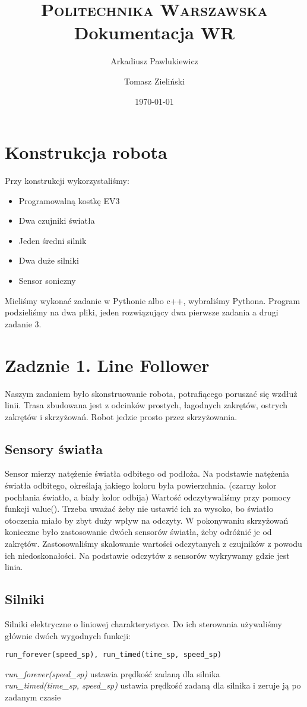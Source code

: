 \documentclass[paper=a4, fontsize=11pt]{scrartcl} %
\title{	
\normalfont \normalsize 
\textsc{Politechnika Warszawska} \\ [25pt] %
\huge Dokumentacja WR \\ %
}
\author{Arkadiusz Pawlukiewicz \and Tomasz Zieliński}
\date{\normalsize\today}
\numberwithin{equation}{section} %
\numberwithin{figure}{section} %
\numberwithin{table}{section} %
\begin{document}
\maketitle 

\section{Konstrukcja robota}
Przy konstrukcji wykorzystaliśmy:
\begin{itemize}  
\item Programowalną kostkę EV3 
\item Dwa czujniki światła  
\item Jeden średni silnik  
\item Dwa duże silniki  
\item Sensor soniczny 
\end{itemize}
Mieliśmy wykonać zadanie w Pythonie albo c++, wybraliśmy Pythona.  
Program podzieliśmy na dwa pliki, jeden rozwiązujący dwa pierwsze zadania a drugi zadanie 3. 
\section{Zadznie 1. Line Follower}
Naszym zadaniem było skonstruowanie robota, potrafiącego poruszać się wzdłuż linii. Trasa zbudowana jest z odcinków prostych, łagodnych zakrętów, ostrych zakrętów i skrzyżowań. Robot  jedzie prosto przez skrzyżowania. 
\subsection{Sensory światła }
Sensor mierzy natężenie światła odbitego od podłoża.  Na podstawie natężenia światła odbitego, określają jakiego koloru była powierzchnia. (czarny kolor pochłania światło, a biały kolor odbija) Wartość odczytywaliśmy przy pomocy funkcji value(). Trzeba uważać żeby nie ustawić ich za wysoko, bo światło otoczenia miało by zbyt duży wpływ na odczyty. W pokonywaniu  skrzyżowań konieczne było zastosowanie dwóch sensorów światła, żeby odróżnić je od zakrętów.  Zastosowaliśmy skalowanie wartości odczytanych z czujników z powodu ich  niedoskonałości.  Na podstawie odczytów z sensorów wykrywamy gdzie jest linia. 
\subsection{Silniki}
Silniki elektryczne o liniowej charakterystyce. Do ich sterowania używaliśmy głównie dwóch wygodnych funkcji:
\begin{lstlisting}
run_forever(speed_sp), run_timed(time_sp, speed_sp)
\end{lstlisting}
\textit{run\_forever(speed\_sp)} ustawia prędkość zadaną dla silnika \\
\textit{run\_timed(time\_sp, speed\_sp)}  ustawia prędkość zadaną dla silnika i zeruje ją po zadanym czasie
\end{document}
